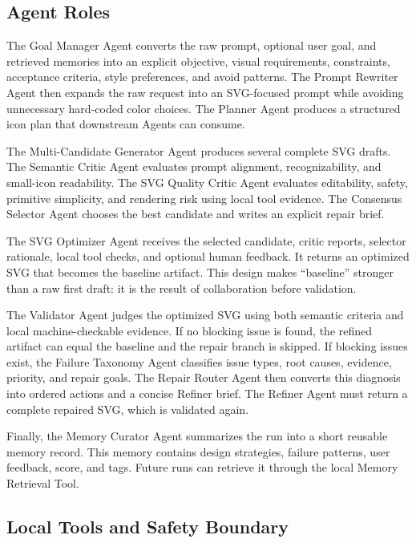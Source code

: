 \documentclass[10pt]{article}
\begin{document}
\subsection{Agent Roles}

The Goal Manager Agent converts the raw prompt, optional user goal, and retrieved memories into an explicit objective, visual requirements, constraints, acceptance criteria, style preferences, and avoid patterns. The Prompt Rewriter Agent then expands the raw request into an SVG-focused prompt while avoiding unnecessary hard-coded color choices. The Planner Agent produces a structured icon plan that downstream Agents can consume.

The Multi-Candidate Generator Agent produces several complete SVG drafts. The Semantic Critic Agent evaluates prompt alignment, recognizability, and small-icon readability. The SVG Quality Critic Agent evaluates editability, safety, primitive simplicity, and rendering risk using local tool evidence. The Consensus Selector Agent chooses the best candidate and writes an explicit repair brief.

The SVG Optimizer Agent receives the selected candidate, critic reports, selector rationale, local tool checks, and optional human feedback. It returns an optimized SVG that becomes the baseline artifact. This design makes ``baseline'' stronger than a raw first draft: it is the result of collaboration before validation.

The Validator Agent judges the optimized SVG using both semantic criteria and local machine-checkable evidence. If no blocking issue is found, the refined artifact can equal the baseline and the repair branch is skipped. If blocking issues exist, the Failure Taxonomy Agent classifies issue types, root causes, evidence, priority, and repair goals. The Repair Router Agent then converts this diagnosis into ordered actions and a concise Refiner brief. The Refiner Agent must return a complete repaired SVG, which is validated again.

Finally, the Memory Curator Agent summarizes the run into a short reusable memory record. This memory contains design strategies, failure patterns, user feedback, score, and tags. Future runs can retrieve it through the local Memory Retrieval Tool.

\subsection{Local Tools and Safety Boundary}
\end{document}

